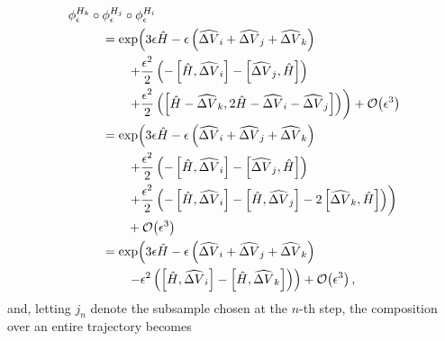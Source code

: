 \documentclass{article}
\begin{document}
\begin{align*}
\phi^{H_{k}}_{\epsilon} \circ \phi^{H_{j}}_{\epsilon} \circ \phi^{H_{i}}_{\epsilon}
&
\\
& \hspace{-15mm} =
\exp \! \left( 
3 \epsilon \hat{H} 
- \epsilon \left( \widehat{ \Delta V}_{i} +  \widehat{ \Delta V}_{j} +  \widehat{ \Delta V}_{k} \right)
\right.
\\
& \hspace{-8mm} \left.
+ \frac{\epsilon^{2}}{2} \left(
- \left[ \hat{H}, \widehat{ \Delta V}_{i} \right]
- \left[ \widehat{ \Delta V}_{j}, \hat{H} \right] \right) \right.
\\
& \hspace{-8mm} \left.
+ \frac{\epsilon^{2}}{2} \left(
\left[ \hat{H} - \widehat{ \Delta V}_{k}, 2 \hat{H} - \widehat{ \Delta V}_{i} - \widehat{ \Delta V}_{j} \right]
\right)
\right)
+ \mathcal{O} \! \left( \epsilon^{3} \right)
\\
& \hspace{-15mm} =
\exp \! \left( 
3 \epsilon \hat{H} 
- \epsilon \left( \widehat{ \Delta V}_{i} + \widehat{ \Delta V}_{j} + \widehat{ \Delta V}_{k} \right)
\right.
\\
& \hspace{-8mm} \left.
+ \frac{\epsilon^{2}}{2} \left(
- \left[ \hat{H}, \widehat{ \Delta V}_{i} \right]
- \left[ \widehat{ \Delta V}_{j}, \hat{H} \right] \right) \right.
\\
& \hspace{-8mm} \left.
+ \frac{\epsilon^{2}}{2} \left(
- \left[ \hat{H}, \widehat{ \Delta V}_{i} \right]
- \left[ \hat{H}, \widehat{ \Delta V}_{j} \right]
- 2 \left[ \widehat{ \Delta V}_{k}, \hat{H} \right] \right) \right)
\\
& \hspace{-8mm}
+ \mathcal{O} \! \left( \epsilon^{3} \right)
\\
& \hspace{-15mm} =
\exp \! \left( 
3 \epsilon \hat{H} 
- \epsilon \left( \widehat{ \Delta V}_{i} + \widehat{ \Delta V}_{j} + \widehat{ \Delta V}_{k} \right)
\right.
\\
& \hspace{-8mm} \left.
- \epsilon^{2} \left( \left[ \hat{H}, \widehat{ \Delta V}_{i} \right] 
- \left[ \hat{H}, \widehat{ \Delta V}_{k} \right] \right)
\right) + \mathcal{O} \! \left( \epsilon^{3} \right),
\end{align*}
%
and, letting $j_{n}$ denote the subsample chosen at the $n$-th step, the composition over
an entire trajectory becomes
\end{document}
